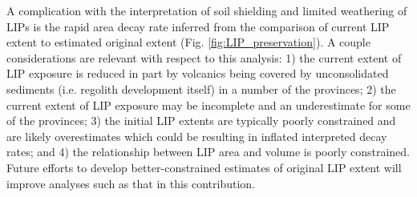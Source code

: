 \documentclass[11pt,letterpaper]{article}
\begin{document}
A complication with the interpretation of soil shielding and limited weathering of LIPs is the rapid area decay rate inferred from the comparison of current LIP extent to estimated original extent (Fig. \ref{fig:LIP_preservation}). A couple considerations are relevant with respect to this analysis: 1) the current extent of LIP exposure is reduced in part by volcanics being covered by unconsolidated sediments (i.e. regolith development itself) in a number of the provinces; 2) the current extent of LIP exposure may be incomplete and an underestimate for some of the provinces; 3) the initial LIP extents are typically poorly constrained and are likely overestimates which could be resulting in inflated interpreted decay rates; and 4) the relationship between LIP area and volume is poorly constrained. Future efforts to develop better-constrained estimates of original LIP extent will improve analyses such as that in this contribution.
\end{document}
